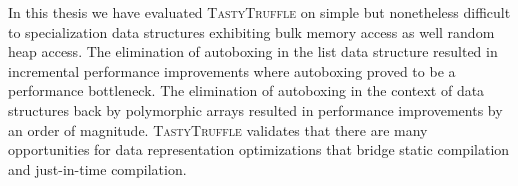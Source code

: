 In this thesis we have evaluated \textsc{TastyTruffle} on simple but nonetheless difficult to specialization data structures exhibiting bulk memory access as well random heap access.
The elimination of autoboxing in the list data structure resulted in incremental performance improvements where autoboxing proved to be a performance bottleneck.
The elimination of autoboxing in the context of data structures back by polymorphic arrays resulted in performance improvements by an order of magnitude.
\textsc{TastyTruffle} validates that there are many opportunities for data representation optimizations that bridge static compilation and just-in-time compilation.
